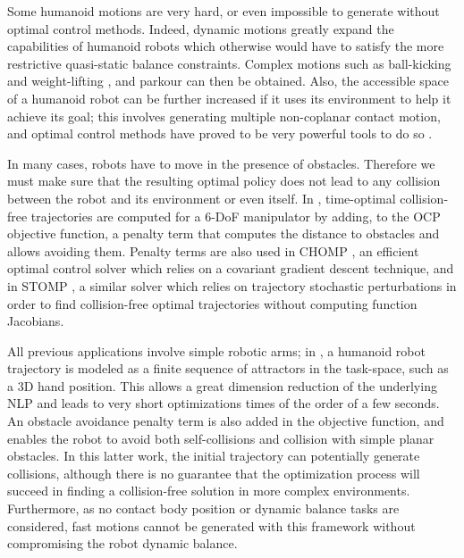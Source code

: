 Some humanoid motions are very hard, or even impossible to generate
without optimal control methods. Indeed, dynamic motions greatly
expand the capabilities of humanoid robots which otherwise would have
to satisfy the more restrictive quasi-static balance
constraints. Complex motions such as ball-kicking
\cite{miossec2006development} and weight-lifting
\cite{arisumi2008dynamic}, and parkour \cite{dellin2012framework} can
then be obtained. Also, the accessible space of a humanoid robot can
be further increased if it uses its environment to help it achieve its
goal; this involves generating multiple non-coplanar contact motion,
and optimal control methods have proved to be very powerful tools to
do so \cite{lengagne2011generation}.

\bigskip

In many cases, robots have to move in the presence of
obstacles. Therefore we must make sure that the resulting optimal
policy does not lead to any collision between the robot and its
environment or even itself. In \cite{dubowsky1986time}, time-optimal
collision-free trajectories are computed for a 6-DoF manipulator by
adding, to the OCP objective function, a penalty term that computes
the distance to obstacles and allows avoiding them. Penalty terms
are also used in \textsc{CHOMP} \cite{ratliff2009chomp}, an efficient
optimal control solver which relies on a covariant gradient descent
technique, and in \textsc{STOMP} \cite{Kalakrishnan2011}, a similar
solver which relies on trajectory stochastic perturbations in order to
find collision-free optimal trajectories without computing function
Jacobians.

All previous applications involve simple robotic arms; in
\cite{Toussaint2007}, a humanoid robot trajectory is modeled as a
finite sequence of attractors in the task-space, such as a 3D hand
position. This allows a great dimension reduction of the underlying
NLP and leads to very short optimizations times of the order of a few
seconds. An obstacle avoidance penalty term is also added in the
objective function, and enables the robot to avoid both
self-collisions and collision with simple planar obstacles. In this
latter work, the initial trajectory can potentially generate
collisions, although there is no guarantee that the optimization
process will succeed in finding a collision-free solution in more
complex environments. Furthermore, as no contact body position or
dynamic balance tasks are considered, fast motions cannot be generated
with this framework without compromising the robot dynamic balance.

